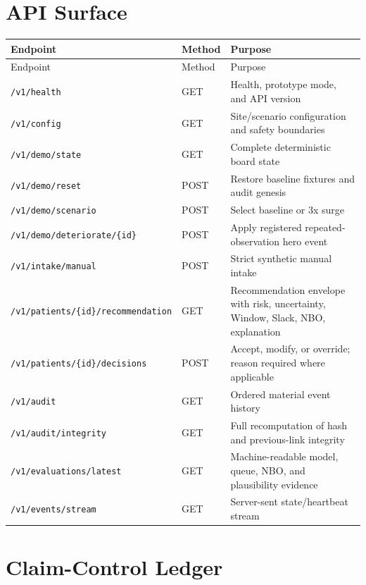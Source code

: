 \documentclass[11pt,a4paper]{article}
\newcommand{\code}[1]{\nolinkurl{#1}}
\begin{document}
\section{API Surface}

\begin{longtable}{@{}L{43mm}L{24mm}L{82mm}@{}}
\toprule
Endpoint & Method & Purpose \\
\midrule
\endfirsthead
\toprule
Endpoint & Method & Purpose \\
\midrule
\endhead
\code{/v1/health} & GET & Health, prototype mode, and API version \\
\code{/v1/config} & GET & Site/scenario configuration and safety boundaries \\
\code{/v1/demo/state} & GET & Complete deterministic board state \\
\code{/v1/demo/reset} & POST & Restore baseline fixtures and audit genesis \\
\code{/v1/demo/scenario} & POST & Select baseline or 3x surge \\
\code{/v1/demo/deteriorate/\{id\}} & POST & Apply registered repeated-observation hero event \\
\code{/v1/intake/manual} & POST & Strict synthetic manual intake \\
\code{/v1/patients/\{id\}/recommendation} & GET & Recommendation envelope with risk, uncertainty, Window, Slack, NBO, explanation \\
\code{/v1/patients/\{id\}/decisions} & POST & Accept, modify, or override; reason required where applicable \\
\code{/v1/audit} & GET & Ordered material event history \\
\code{/v1/audit/integrity} & GET & Full recomputation of hash and previous-link integrity \\
\code{/v1/evaluations/latest} & GET & Machine-readable model, queue, NBO, and plausibility evidence \\
\code{/v1/events/stream} & GET & Server-sent state/heartbeat stream \\
\bottomrule
\end{longtable}

\section{Claim-Control Ledger}
\end{document}
